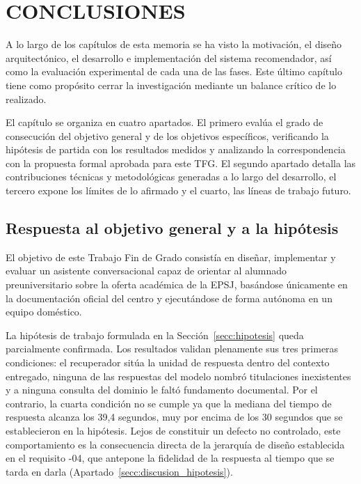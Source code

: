 \chapter{CONCLUSIONES}
\label{cap:conclusiones}

A lo largo de los capítulos de esta memoria se ha visto la motivación, el diseño arquitectónico, el desarrollo e implementación del sistema recomendador, así como la evaluación experimental de cada una de las fases. Este último capítulo tiene como propósito cerrar la investigación mediante un balance crítico de lo realizado.

El capítulo se organiza en cuatro apartados. El primero evalúa el grado de consecución del objetivo general y de los objetivos específicos, verificando la hipótesis de partida con los resultados medidos y analizando la correspondencia con la propuesta formal aprobada para este TFG. El segundo apartado detalla las contribuciones técnicas y metodológicas generadas a lo largo del desarrollo, el tercero expone los límites de lo afirmado y el cuarto, las líneas de trabajo futuro.

\section[Respuesta al objetivo general y a la hipótesis]{Respuesta al objetivo general y a la hipótesis}
\label{secc:cumplimiento_objetivos}

 El objetivo de este Trabajo Fin de Grado consistía en diseñar, implementar y evaluar un asistente conversacional capaz de orientar al alumnado preuniversitario sobre la oferta académica de la EPSJ, basándose únicamente en la documentación oficial del centro y ejecutándose de forma autónoma en un equipo doméstico.

La hipótesis de trabajo formulada en la Sección~\ref{secc:hipotesis} queda parcialmente confirmada. Los resultados validan plenamente sus tres primeras condiciones: el recuperador sitúa la unidad de respuesta dentro del contexto entregado, ninguna de las respuestas del modelo nombró titulaciones inexistentes y a ninguna consulta del dominio le faltó fundamento documental. Por el contrario, la cuarta condición no se cumple ya que la mediana del tiempo de respuesta alcanza los 39,4 segundos, muy por encima de los 30 segundos que se establecieron en la hipótesis.  Lejos de constituir un defecto no controlado, este comportamiento es la consecuencia directa de la jerarquía de diseño establecida en el requisito -04, que antepone la fidelidad de la respuesta al tiempo que se tarda en darla (Apartado~\ref{secc:discusion_hipotesis}).


